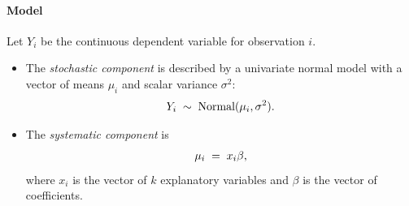 \documentclass[letterpaper,10pt,english]{sphinxmanual}
\begin{document}
\paragraph{Model}
\label{zelig-normal:model}
Let \(Y_i\) be the continuous dependent variable for observation
\(i\).
\begin{itemize}
\item {} 
The \emph{stochastic component} is described by a univariate normal model
with a vector of means \(\mu_i\) and scalar variance
\(\sigma^2\):
\begin{gather}
\begin{split}Y_i \; \sim \; \textrm{Normal}(\mu_i, \sigma^2).\end{split}\notag
\end{gather}
\item {} 
The \emph{systematic component} is
\begin{gather}
\begin{split}\mu_i \;= \; x_i \beta,\end{split}\notag
\end{gather}
where \(x_i\) is the vector of \(k\) explanatory variables
and \(\beta\) is the vector of coefficients.

\end{itemize}
\end{document}
